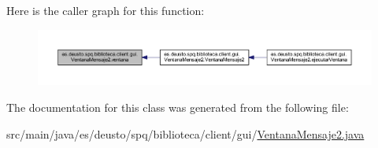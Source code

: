 Here is the caller graph for this function\+:
\nopagebreak
\begin{figure}[H]
\begin{center}
\leavevmode
\includegraphics[width=350pt]{classes_1_1deusto_1_1spq_1_1biblioteca_1_1client_1_1gui_1_1_ventana_mensaje2_a58e122a68c01e47a8ef6f9e9e2d54ca3_icgraph}
\end{center}
\end{figure}


The documentation for this class was generated from the following file\+:\begin{DoxyCompactItemize}
\item 
src/main/java/es/deusto/spq/biblioteca/client/gui/\mbox{\hyperlink{_ventana_mensaje2_8java}{Ventana\+Mensaje2.\+java}}\end{DoxyCompactItemize}
